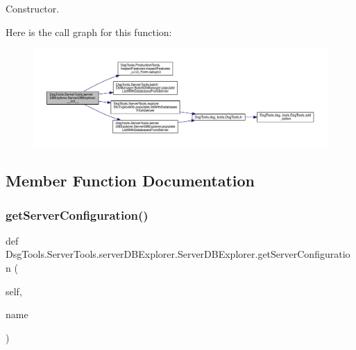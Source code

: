 \begin{DoxyVerb}Constructor.\end{DoxyVerb}
 Here is the call graph for this function\+:
\nopagebreak
\begin{figure}[H]
\begin{center}
\leavevmode
\includegraphics[width=350pt]{class_dsg_tools_1_1_server_tools_1_1server_d_b_explorer_1_1_server_d_b_explorer_a4c1f8f2c6b1a632a3c322ebce2a8214b_cgraph}
\end{center}
\end{figure}


\subsection{Member Function Documentation}
\mbox{\label{class_dsg_tools_1_1_server_tools_1_1server_d_b_explorer_1_1_server_d_b_explorer_aed0bbfc66b1e9d655c7458335efdac7b}} 
\subsubsection{\texorpdfstring{get\+Server\+Configuration()}{getServerConfiguration()}}
{\footnotesize\ttfamily def Dsg\+Tools.\+Server\+Tools.\+server\+D\+B\+Explorer.\+Server\+D\+B\+Explorer.\+get\+Server\+Configuration (\begin{DoxyParamCaption}\item[{}]{self,  }\item[{}]{name }\end{DoxyParamCaption})}

